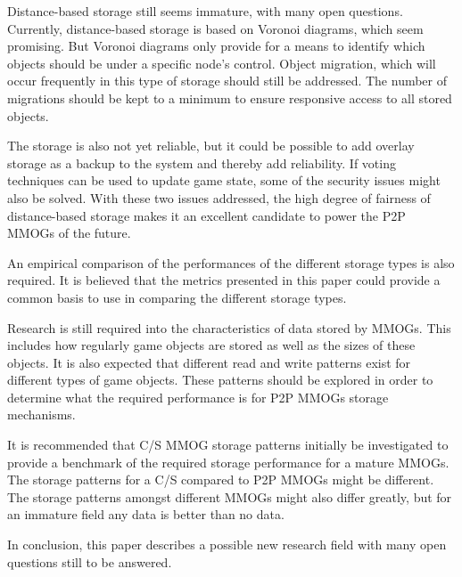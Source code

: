 Distance-based storage still seems immature, with many open questions. Currently, distance-based storage is based on Voronoi diagrams, which seem
promising. But Voronoi diagrams only provide for a means to identify which objects should be under a specific node's control. Object migration, which
will occur frequently in this type of storage should still be addressed. The number of migrations should be kept to a minimum to ensure responsive
access to all stored objects.

The storage is also not yet reliable, but it could be possible to add overlay storage as a backup to the system and thereby add reliability. If
voting techniques can be used to update game state, some of the security issues might also be solved. With these two issues addressed, the high
degree of fairness of distance-based storage makes it an excellent candidate to power the P2P MMOGs of the future.

An empirical comparison of the performances of the different storage types is also required. It is believed that the metrics presented in this paper
could provide a common basis to use in comparing the different storage types.

Research is still required into the characteristics of data stored by MMOGs. This includes how regularly game objects are stored as well as the sizes
of these objects. It is also expected that different read and write patterns exist for different types of game objects. These patterns should be
explored in order to determine what the required performance is for P2P MMOGs storage mechanisms.

It is recommended that C/S MMOG storage patterns initially be investigated to provide a benchmark of the required storage performance for a mature
MMOGs. The storage patterns for a C/S compared to P2P MMOGs might be different. The storage patterns amongst different MMOGs might also differ
greatly, but for an immature field any data is better than no data.

In conclusion, this paper describes a possible new research field with many open questions still to be answered.
